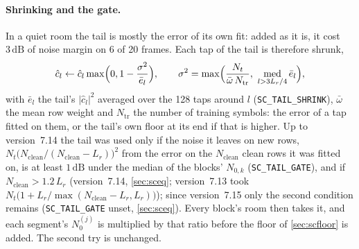 \documentclass[11pt,a4paper]{article}
\newcommand{\dB}{\,\mathrm{dB}}
\newcommand{\code}[1]{\texttt{#1}}
\theoremstyle{remark}
\begin{document}
\paragraph{Shrinking and the gate.} In a quiet room the tail is mostly the error of its own fit: added as it is, it cost $3\dB$ of noise margin on 6 of 20 frames. Each tap of the tail is therefore shrunk,
\begin{equation}
\hat c_l \leftarrow \hat c_l \max\Bigl(0, 1 - \frac{\sigma^2}{\bar e_l}\Bigr), \qquad \sigma^2 = \max\Bigl(\frac{N_t}{\bar\omega\, N_{\mathrm{tr}}},\ \operatorname*{med}_{l > 3L_r/4} \bar e_l\Bigr),
\end{equation}
with $\bar e_l$ the tail's $|\hat c_l|^2$ averaged over the 128 taps around $l$ (\code{SC\_TAIL\_SHRINK}), $\bar\omega$ the mean row weight and $N_{\mathrm{tr}}$ the number of training symbols: the error of a tap fitted on them, or the tail's own floor at its end if that is higher. Up to version~7.14 the tail was used only if the noise it leaves on new rows, $N_t\bigl(N_{\mathrm{clean}}/(N_{\mathrm{clean}} - L_r)\bigr)^2$ from the error on the $N_{\mathrm{clean}}$ clean rows it was fitted on, is at least $1\dB$ under the median of the blocks' $N_{0,k}$ (\code{SC\_TAIL\_GATE}), and if $N_{\mathrm{clean}} > 1.2\,L_r$ (version~7.14, \cref{sec:sceq}; version~7.13 took $N_t\bigl(1 + L_r/\max(N_{\mathrm{clean}} - L_r, L_r)\bigr)$); since version~7.15 only the second condition remains (\code{SC\_TAIL\_GATE} unset, \cref{sec:sceq}). Every block's room then takes it, and each segment's $N_0^{(j)}$ is multiplied by that ratio before the floor of \cref{sec:scfloor} is added. The second try is unchanged.
\end{document}
